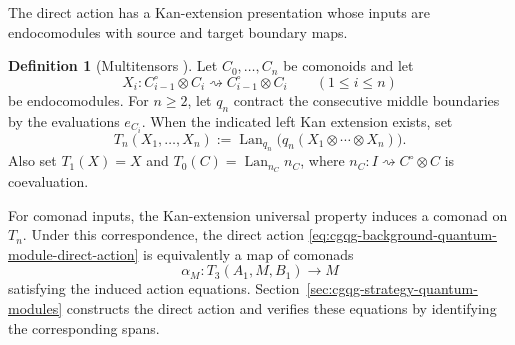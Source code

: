 \documentclass[oneside]{article}
\theoremstyle{plain}
\theoremstyle{definition}
\newtheorem{definition}[theorem]{Definition}
\theoremstyle{remark}
\begin{document}
The direct action has a Kan-extension presentation whose inputs are endocomodules with source and target boundary maps.

\begin{definition}[Multitensors {\cite[\S3, Eqs.~(4)--(5)]{Chikhladze2010QuantumModules}}]
\label{def:cgqg-background-multitensors}
Let \(C_0,\ldots,C_n\) be comonoids and let
\[
 X_i:C_{i-1}^\circ\otimes C_i
       \rightsquigarrow C_{i-1}^\circ\otimes C_i
       \qquad(1\leq i\leq n)
\]
be endocomodules. For \(n\geq2\), let \(q_n\) contract the consecutive
middle boundaries by the evaluations \(e_{C_i}\). When the indicated
left Kan extension exists, set
\[
 T_n(X_1,\ldots,X_n)
 :=\operatorname{Lan}_{q_n}
       \bigl(q_n(X_1\otimes\cdots\otimes X_n)\bigr).
\]
Also set \(T_1(X)=X\) and
\(T_0(C)=\operatorname{Lan}_{n_C}n_C\), where
\(n_C:I\rightsquigarrow C^\circ\otimes C\) is coevaluation.
\end{definition}

For comonad inputs, the Kan-extension universal property induces a comonad
on \(T_n\). Under this correspondence, the direct action
\eqref{eq:cgqg-background-quantum-module-direct-action} is equivalently a
map of comonads
\begin{equation}
 \alpha_M:T_3(A_1,M,B_1)\longrightarrow M
 \label{eq:cgqg-background-quantum-module-action}
\end{equation}
satisfying the induced action equations. Section~\ref{sec:cgqg-strategy-quantum-modules} constructs the direct action and verifies these equations by identifying the corresponding spans.
\end{document}

